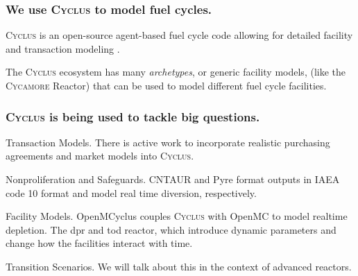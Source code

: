 \documentclass[9pt]{beamer}
\newcommand{\cycamore}{\textsc{Cycamore}\xspace}
\newcommand{\cyclus}{\textsc{Cyclus}\xspace}
\begin{document}
\begin{frame}
  \frametitle{We use \cyclus to model fuel cycles.}
  \vspace{10pt}
  \cyclus is an open-source agent-based fuel cycle code allowing for detailed facility and transaction modeling \cite{huff_fundamental_2016}.
  \begin{center}
  \end{center} \pause

  The \cyclus ecosystem has many \textit{archetypes}, or generic facility models, (like the \cycamore Reactor) that can be used to model different fuel cycle facilities.
  \end{frame}

  \begin{frame}
    \frametitle{\cyclus is being used to tackle big questions.}
    \begin{block}{Transaction Models.}
        There is active work to incorporate realistic purchasing agreements and market models into \cyclus.
    \end{block} \pause
    \begin{block}{Nonproliferation and Safeguards.}
        CNTAUR \cite{mummah_advanced_2024} and Pyre \cite{westphal_modeling_2019} format outputs in IAEA code 10 format and model real time diversion, respectively.
    \end{block} \pause
    \begin{block}{Facility Models.}
      OpenMCyclus \cite{openmcyclus_paper} couples \cyclus with OpenMC to model realtime depletion. The \gls{dpr} and \gls{tod} reactor, which introduce dynamic parameters and change how the facilities interact with time.
  \end{block} \pause
    \begin{block}{Transition Scenarios.}
        We will talk about this in the context of advanced reactors.
    \end{block}
  \end{frame}
\end{document}
